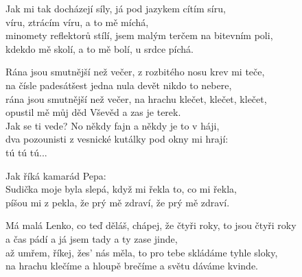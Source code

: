 
\ve{}
Jak mi tak docházejí síly, já pod jazykem cítím síru,\\
víru, ztrácím víru, a to mě míchá,\\
minomety reflektorů stílí, jsem malým terčem na bitevním poli,\\
kdekdo mě skolí, a to mě bolí, u srdce píchá.

\cho{}
Rána jsou smutnější než večer, z rozbitého nosu krev mi teče,\\
na čísle padesátšest jedna nula devět nikdo to nebere,\\
rána jsou smutnější než večer, na hrachu klečet, klečet, klečet,\\
opustil mě můj děd Vševěd a zas je terek.\\
Jak se ti vede? No někdy fajn a někdy je to v háji,\\
dva pozounisti z vesnické kutálky pod okny mi hrají:\\
tú tú tú... \quad{}\qquad{}\qquad{} \qquad{} \qquad{}\qquad{}\qquad{}\qquad{}\qquad{}\qquad{}\qquad{}\qquad{} 

\ve{}
Jak říká kamarád Pepa: \\
Sudička moje byla slepá, když mi řekla to, co mi řekla,\\
píšou mi z pekla, že prý mě zdraví, že prý mě zdraví. 

\cho{} 

\ve{}
Má malá Lenko, co teď děláš, chápej, že čtyři roky, to jsou čtyři roky\\
a čas pádí a já jsem tady a ty zase jinde,\\
až umřem, říkej, žes' nás měla, to pro tebe skládáme tyhle sloky,\\
na hrachu klečíme a hloupě brečíme a světu dáváme kvinde. 

\cho{} 

\esong